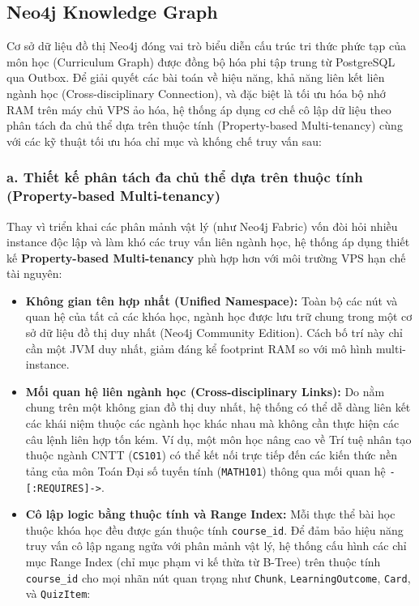 \subsection{Neo4j Knowledge Graph}

Cơ sở dữ liệu đồ thị Neo4j đóng vai trò biểu diễn cấu trúc tri thức phức
tạp của môn học (Curriculum Graph) được đồng bộ hóa phi tập trung từ
PostgreSQL qua Outbox. Để giải quyết các bài toán về hiệu năng, khả năng
liên kết liên ngành học (Cross-disciplinary Connection), và đặc biệt là
tối ưu hóa bộ nhớ RAM trên máy chủ VPS ảo hóa, hệ thống áp dụng cơ chế
cô lập dữ liệu theo phân tách đa chủ thể dựa trên thuộc tính
(Property-based Multi-tenancy) cùng với các kỹ thuật tối ưu hóa chỉ mục
và khống chế truy vấn sau:

\subsubsection*{a. Thiết kế phân tách đa chủ thể dựa trên thuộc tính (Property-based Multi-tenancy)}

Thay vì triển khai các phân mảnh vật lý (như Neo4j Fabric) vốn đòi hỏi
nhiều instance độc lập và làm khó các truy vấn liên ngành học, hệ thống
áp dụng thiết kế \textbf{Property-based Multi-tenancy} phù hợp hơn với
môi trường VPS hạn chế tài nguyên:

\begin{itemize}
    \item \textbf{Không gian tên hợp nhất (Unified Namespace):} Toàn bộ
          các nút và quan hệ của tất cả các khóa học, ngành học được lưu
          trữ chung trong một cơ sở dữ liệu đồ thị duy nhất (Neo4j
          Community Edition). Cách bố trí này chỉ cần một JVM duy nhất,
          giảm đáng kể footprint RAM so với mô hình multi-instance.
    \item \textbf{Mối quan hệ liên ngành học (Cross-disciplinary Links):}
          Do nằm chung trên một không gian đồ thị duy nhất, hệ thống có
          thể dễ dàng liên kết các khái niệm thuộc các ngành học khác nhau
          mà không cần thực hiện các câu lệnh liên hợp tốn kém. Ví dụ, một
          môn học nâng cao về Trí tuệ nhân tạo thuộc ngành CNTT
          (\texttt{CS101}) có thể kết nối trực tiếp đến các kiến thức nền
          tảng của môn Toán Đại số tuyến tính (\texttt{MATH101}) thông qua
          mối quan hệ \texttt{-[:REQUIRES]->}.
    \item \textbf{Cô lập logic bằng thuộc tính và Range Index:} Mỗi thực
          thể bài học thuộc khóa học đều được gán thuộc tính
          \texttt{course\_id}. Để đảm bảo hiệu năng truy vấn cô lập ngang
          ngửa với phân mảnh vật lý, hệ thống cấu hình các chỉ mục Range
          Index (chỉ mục phạm vi kế thừa từ B-Tree) trên thuộc tính
          \texttt{course\_id} cho mọi nhãn nút quan trọng như
          \texttt{Chunk}, \texttt{LearningOutcome}, \texttt{Card}, và
          \texttt{QuizItem}:
\end{itemize}

